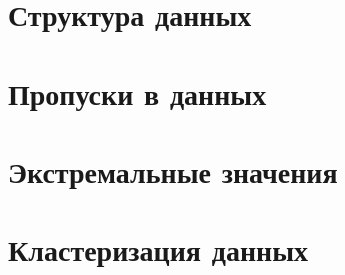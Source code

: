 \section{Структура данных}

\section{Пропуски в данных}

\section{Экстремальные значения}

\section{Кластеризация данных}
